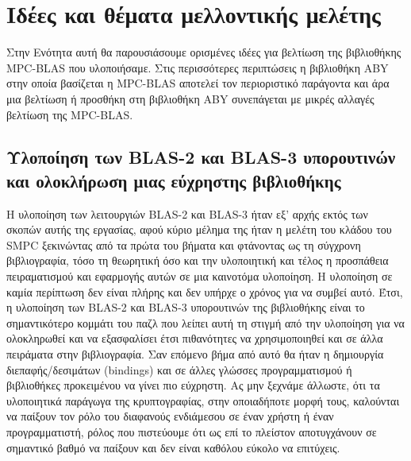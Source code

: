 
\section{Ιδέες και θέματα μελλοντικής μελέτης}

Στην Ενότητα αυτή θα παρουσιάσουμε ορισμένες ιδέες για βελτίωση της βιβλιοθήκης MPC-BLAS που υλοποιήσαμε. Στις περισσότερες περιπτώσεις η βιβλιοθήκη ABY στην οποία βασίζεται η MPC-BLAS αποτελεί τον περιοριστικό παράγοντα και άρα μια βελτίωση ή προσθήκη στη βιβλιοθήκη ABY συνεπάγεται με μικρές αλλαγές βελτίωση της MPC-BLAS.

\subsection{Υλοποίηση των BLAS-2 και BLAS-3 υπορουτινών και ολοκλήρωση μιας εύχρηστης βιβλιοθήκης}
Η υλοποίηση των λειτουργιών BLAS-2 και BLAS-3 ήταν εξ' αρχής εκτός των σκοπών αυτής της εργασίας, αφού κύριο μέλημα της ήταν η μελέτη του κλάδου του SMPC ξεκινώντας από τα πρώτα του βήματα και φτάνοντας ως τη σύγχρονη βιβλιογραφία, τόσο τη θεωρητική όσο και την υλοποιητική και τέλος η προσπάθεια πειραματισμού και εφαρμογής αυτών σε μια καινοτόμα υλοποίηση. Η υλοποίηση σε καμία περίπτωση δεν είναι πλήρης και δεν υπήρχε ο χρόνος για να συμβεί αυτό. Έτσι, η υλοποίηση των BLAS-2 και BLAS-3 υπορουτινών της βιβλιοθήκης είναι το σημαντικότερο κομμάτι του παζλ που λείπει αυτή τη στιγμή από την υλοποίηση για να ολοκληρωθεί και να εξασφαλίσει έτσι πιθανότητες να χρησιμοποιηθεί και σε άλλα πειράματα στην βιβλιογραφία. Σαν επόμενο βήμα από αυτό θα ήταν η δημιουργία διεπαφής/δεσιμάτων (bindings) και σε άλλες γλώσσες προγραμματισμού ή βιβλιοθήκες προκειμένου να γίνει πιο εύχρηστη. Ας μην ξεχνάμε άλλωστε, ότι τα υλοποιητικά παράγωγα της κρυπτογραφίας, στην οποιαδήποτε μορφή τους, καλούνται να παίξουν τον ρόλο του διαφανούς ενδιάμεσου σε έναν χρήστη ή έναν προγραμματιστή, ρόλος που πιστεύουμε ότι ως επί το πλείστον αποτυγχάνουν σε σημαντικό βαθμό να παίξουν και δεν είναι καθόλου εύκολο να επιτύχεις.

